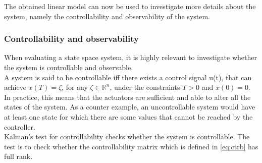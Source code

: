 %
%

The obtained linear model can now be used to investigate more details about the system, namely the controllability and observability of the system.


\subsubsection{Controllability and observability}
When evaluating a state space system, it is highly relevant to investigate whether the system is controllable and observable. \\
A system is said to be controllable iff there exists a control signal u(t), that can achieve $x(T) = \zeta$, for any $\zeta \in \mathbb{R} ^{n}$, under the constraints $T>0$ and $x(0)=0$. In practice, this means that the actuators are sufficient and able to alter all the states of the system. As a counter example, an uncontrollable system would have at least one state for which there are some values that cannot be reached by the controller.\\
Kalman's test for controllability checks whether the system is controllable. The test is to check whether the controllability matrix which is defined in \cref{eq:ctrb} has full rank.

